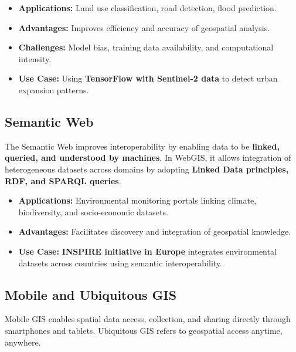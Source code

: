 \documentclass[
  11pt,
  letterpaper,
]{book}
\providecommand{\tightlist}{%
  \setlength{\itemsep}{0pt}\setlength{\parskip}{0pt}}
\begin{document}
\begin{itemize}
\tightlist
\item
  \textbf{Applications:} Land use classification, road detection, flood
  prediction.\\
\item
  \textbf{Advantages:} Improves efficiency and accuracy of geospatial
  analysis.\\
\item
  \textbf{Challenges:} Model bias, training data availability, and
  computational intensity.\\
\item
  \textbf{Use Case:} Using \textbf{TensorFlow with Sentinel-2 data} to
  detect urban expansion patterns.
\end{itemize}

\subsection{Semantic Web}\label{semantic-web}

The Semantic Web improves interoperability by enabling data to be
\textbf{linked, queried, and understood by machines}. In WebGIS, it
allows integration of heterogeneous datasets across domains by adopting
\textbf{Linked Data principles, RDF, and SPARQL queries}.

\begin{itemize}
\tightlist
\item
  \textbf{Applications:} Environmental monitoring portals linking
  climate, biodiversity, and socio-economic datasets.\\
\item
  \textbf{Advantages:} Facilitates discovery and integration of
  geospatial knowledge.\\
\item
  \textbf{Use Case:} \textbf{INSPIRE initiative in Europe} integrates
  environmental datasets across countries using semantic
  interoperability.
\end{itemize}

\subsection{Mobile and Ubiquitous GIS}\label{mobile-and-ubiquitous-gis}

Mobile GIS enables spatial data access, collection, and sharing directly
through smartphones and tablets. Ubiquitous GIS refers to geospatial
access anytime, anywhere.
\end{document}
